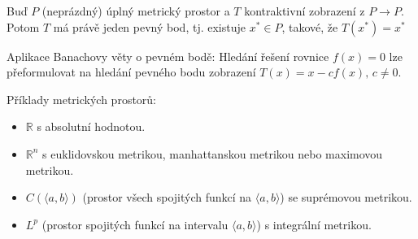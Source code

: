 \begin{theorem}
Buď $P$ (neprázdný) úplný metrický prostor a $T$ kontraktivní zobrazení z $P \rightarrow P$. Potom $T$ má právě jeden pevný bod, tj. existuje $x^* \in P $, takové, že $T(x^*)=x^*$ 

\end{theorem}
Aplikace Banachovy věty o pevném bodě: Hledání řešení rovnice $f(x) = 0$ lze přeformulovat na hledání pevného bodu zobrazení $T(x) = x - cf(x), \, c \neq 0$.
\begin{example}
Příklady metrických prostorů:
\begin{itemize}
\item $\mathbb{R}$ s absolutní hodnotou.
\item $\mathbb{R}^n$ s euklidovskou metrikou, manhattanskou metrikou nebo maximovou metrikou.
\item $C(\langle a,b \rangle)$ (prostor všech spojitých funkcí na $\langle a,b \rangle$) se suprémovou metrikou.
\item  $L^p$ (prostor spojitých funkcí na intervalu $\langle a,b \rangle$) s integrální metrikou.
\end{itemize}  
\end{example}

